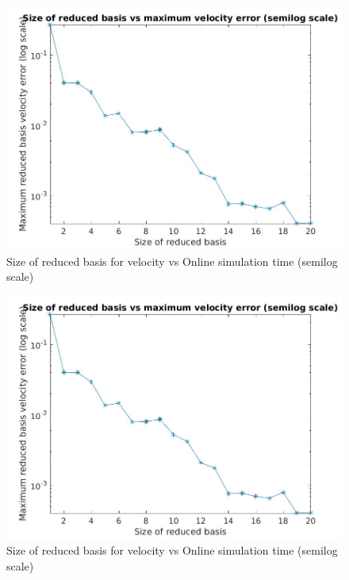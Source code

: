 \documentclass[graybox]{svmult}
\begin{document}
\begin{figure}
  \includegraphics[width=\linewidth]{size_vs_maximum_reduced_basis_velocity_error_semilog.jpg}
  \caption{Size of reduced basis for velocity vs Online simulation time (semilog scale)} 
\label{online_simulation_time}
\end{figure}

\begin{figure}
  \includegraphics[width=\linewidth]{size_vs_maximum_reduced_basis_velocity_error_semilog.jpg}
  \caption{Size of reduced basis for velocity vs Online simulation time (semilog scale)} 
\label{online_simulation_time}
\end{figure}
\end{document}
